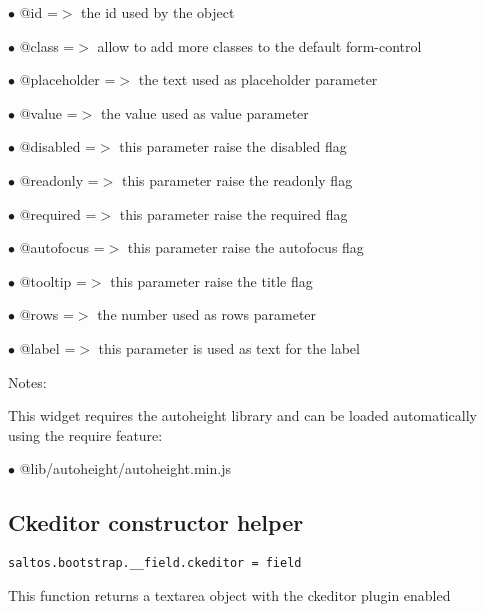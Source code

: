 \documentclass[a4paper]{book}
\begin{document}
\begin{compactitem}
\item[\color{myblue}$\bullet$] @id          =$>$ the id used by the object
\item[\color{myblue}$\bullet$] @class       =$>$ allow to add more classes to the default form-control
\item[\color{myblue}$\bullet$] @placeholder =$>$ the text used as placeholder parameter
\item[\color{myblue}$\bullet$] @value       =$>$ the value used as value parameter
\item[\color{myblue}$\bullet$] @disabled    =$>$ this parameter raise the disabled flag
\item[\color{myblue}$\bullet$] @readonly    =$>$ this parameter raise the readonly flag
\item[\color{myblue}$\bullet$] @required    =$>$ this parameter raise the required flag
\item[\color{myblue}$\bullet$] @autofocus   =$>$ this parameter raise the autofocus flag
\item[\color{myblue}$\bullet$] @tooltip     =$>$ this parameter raise the title flag
\item[\color{myblue}$\bullet$] @rows        =$>$ the number used as rows parameter
\item[\color{myblue}$\bullet$] @label       =$>$ this parameter is used as text for the label
\end{compactitem}

Notes:

This widget requires the autoheight library and can be loaded automatically using the require
feature:

\begin{compactitem}
\item[\color{myblue}$\bullet$] @lib/autoheight/autoheight.min.js
\end{compactitem}

\hypertarget{toc444}{}
\subsection{Ckeditor constructor helper}

\begin{lstlisting}
saltos.bootstrap.__field.ckeditor = field
\end{lstlisting}

This function returns a textarea object with the ckeditor plugin enabled
\end{document}
